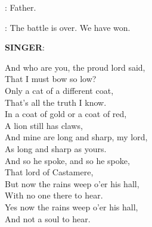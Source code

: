 

\CERSEI: Father. 

\TYWIN: The battle is over. We have won. 


\textbf{SINGER}: 

    And who are you, the proud lord said,\\
    That I must bow so low? \\
    Only a cat of a different coat, \\
    That's all the truth I know. \\
    In a coat of gold or a coat of red, \\
    A lion still has claws, \\
    And mine are long and sharp, my lord, \\
    As long and sharp as yours. \\
    And so he spoke, and so he spoke, \\
    That lord of Castamere, \\
    But now the rains weep o'er his hall, \\
    With no one there to hear. \\
    Yes now the rains weep o'er his hall, \\
    And not a soul to hear.\\


